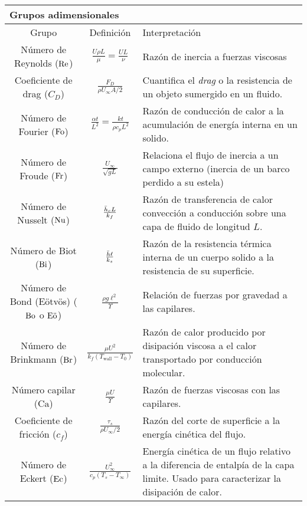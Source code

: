 \begin{table}[htb!]
\vspace{-1cm}
\centering
\begin{tabularx}{12cm}{ *{2}{c}
>{\scriptsize\arraybackslash}X }
\multicolumn{3}{l}{Grupos adimensionales \citep{kreith2011principles}}\\\hline
Grupo               & Definición & \normalsize Interpretación \\\hline
Número de Reynolds ($\Reynolds$)  &   $\frac{U\rho L}{\mu}=\frac{U L}{\nu}$         &  Razón de inercia a fuerzas viscosas \breathingspace             \\
Coeficiente de drag ($C_D$)& $\frac{F_D}{\rho U_\infty A/2}$            &  Cuantifica el \textit{drag} o la resistencia de un objeto sumergido en un fluido.             \\
Número de Fourier ($\Fo$)  &    $\frac{\alpha t}{L^2}=\frac{k t}{\rho c_p L^2} $        & Razón de conducción de calor a
la acumulación de energía interna en un solido. \\
 Número de Froude    ($\Froude$)&  $\frac{U_\infty}{\sqrt{g L}}$          &   Relaciona el flujo de inercia a un campo externo (inercia de un barco perdido a su estela)            \\
Número de Nusselt  ($\Nusselt$) &   $\frac{\hcb L}{k_f}$         & Razón de transferencia de calor convección a conducción sobre una capa de fluido de longitud $L$.              \\
Número de Biot  ($\Biot$)    &     $\frac{\hhb \ell}{k_s} $      & Razón de la resistencia térmica interna de un cuerpo solido a la resistencia de su superficie.           \\
Número de Bond (Eötvös) ($\Bond$ o $\Eotvos$)    &     $\frac{\rho g \ell^2}{\Upsilon} $      & Relación de fuerzas por gravedad a las capilares.           \\
Número de Brinkmann ($\Brinkmann$) & $\frac{\mu U^2}{k_f(T_{\textrm{wall}}-T_0)}$ &Razón de calor producido por disipación viscosa a el calor transportado por conducción molecular. \\
Número capilar ($\textrm{Ca}$)& $\frac{\mu U}{\Upsilon}$            &  Razón de fuerzas viscosas con las capilares.              \\
Coeficiente de fricción ($c_f$)& $\frac{\tau_s}{\rho U_\infty/2}$            &  Razón del corte de superficie a la energía cinética del flujo.              \\
Número de Eckert  ($\Eckert$)  &    $\frac{U_\infty^2}{c_p\left(T_s-T_\infty\right)}$        &Energía cinética de un flujo relativo a la diferencia de entalpía de la capa limite. Usado para caracterizar la disipación de calor.                \\

\end{tabularx}
\end{table}
